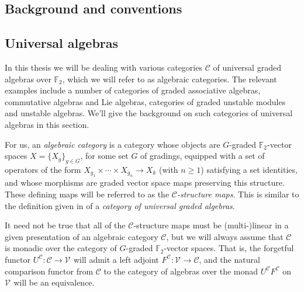 \documentclass[11pt]{amsart} \renewcommand{\baselinestretch}{1.2}
\theoremstyle{plain}
\numberwithin{equation}{section} %
\theoremstyle{plain}
\numberwithin{equation}{chapter} %
\renewcommand{\to}{\longrightarrow}
\newcommand{\calV}{\mathcal{V}}
\newcommand{\calc}{\mathcal{C}}
\newcommand{\citeBOX}[2][]{\cite[\mbox{#1}]{#2}}
\newcommand{\vect}[2]{\calV^{#1}_{#2}}
\newcommand{\F}{\mathbb{F}}
\newcommand{\Ftwo}{\F_2}
\newcommand{\SectionOrChapter}[1]{\section{\textbf{#1}}}
\newcommand{\SubsectionOrSection}[1]{\subsection{#1}}
\begin{document}
\begin{Conventions and notation}
\SectionOrChapter{Background and conventions}
\label{Conventions and notation}

\SubsectionOrSection{Universal algebras}
\label{Universal algebras}
In this thesis we will be dealing with various categories $\calc$ of universal graded algebras over $\Ftwo $, which we will refer to as algebraic categories. The relevant examples include a number of categories of graded associative algebras, commutative algebras and Lie algebras,  categories of graded unstable modules and unstable algebras. We'll give the background on such categories of universal algebras in this section.



For us, an \emph{algebraic category} is a category whose objects are $G$-graded $\Ftwo $-vector spaces $X=\{X_g\}_{g\in G}$, for some set $G$ of gradings, equipped with a set of operators of the form $X_{g_1}\times \cdots \times X_{g_n}\to X_k$ (with $n\geq1$)  satisfying a set identities, and whose morphisms are graded vector space maps preserving this structure. These defining maps will be referred to as the \emph{$\calc$-structure maps}. This is similar to the definition given in  \citeBOX[\S2.1]{Blanc_Stover-Groth_SS.pdf} of a \emph{category of universal graded algebras}.  %

It need not  be true that all of the $\calc$-structure maps must be (multi-)linear in a given presentation of an algebraic category $\calc$, but we will always assume that  $\calc$ is monadic over the category of $G$-graded $\Ftwo $-vector spaces. That is, the forgetful functor $U^\calc:\calc\to\vect{}{}$ will admit a left adjoint  $F^\calc:\vect{}{}\to\calc$, and the natural comparison functor from $\calc$ to the category of algebras over the monad $U^{\calc}F^{\calc}$ on $\vect{}{}$ will be an equivalence.


\end{Conventions and notation}
\end{document}
